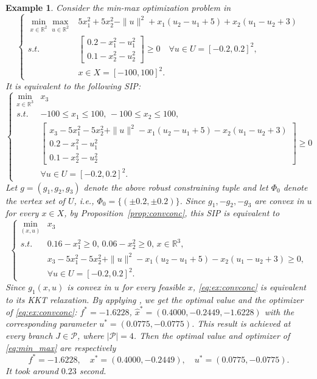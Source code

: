 \documentclass{amsart}
\theoremstyle{plain}
\newtheorem{exmp}[theorem]{Example}
\newcommand{\re}{\mathbb{R}}
\newcommand{\st}{\mathit{s.t.}}
\newcommand{\mc}[1]{\mathcal{#1}}
\newcommand{\bbm}{\begin{bmatrix}}
\newcommand{\ebm}{\end{bmatrix}}
\numberwithin{equation}{section}
\begin{document}
			\begin{exmp}\label{ex:convconc}
			Consider the min-max optimization problem in \cite{PangWu2020}
			\begin{equation}\label{eq:min_max}
			\left\{\begin{array}{cl}
				\min\limits_{x\in\re^2} \max\limits_{u\in \re^2}  & 5x_1^2+5x_2^2-\|u\|^2+x_1(u_2-u_1+5)+x_2(u_1-u_2+3)\\
				\st  & \bbm 0.2-x_1^2-u_1^2\\ 0.1-x_2^2-u_2^2\ebm\ge 0\quad \forall u\in U=[-0.2,0.2]^2,\\
				& x\in X=[-100,100]^2.
			\end{array}
			\right.
			\end{equation}
			It is equivalent to the following SIP:
			\[
			\left\{\begin{array}{cl}
				\min\limits_{x\in\re^3} & x_3\\
				\st & -100\le x_1\le 100,\, -100\le x_2\le 100,\\
				& \bbm x_3-5x_1^2-5x_2^2+\|u\|^2-x_1(u_2-u_1+5)-x_2(u_1-u_2+3)\\ 0.2-x_1^2-u_1^2\\ 0.1-x_2^2-u_2^2
				\ebm \ge 0\\
				& \forall u\in U = [-0.2,0.2]^2.
			\end{array}
			\right.
			\]
			Let $g= (g_1,g_2,g_3)$ denote the above robust constraining tuple 
			and let $\Phi_0$ denote the vertex set of $U$, i.e., 
			$\Phi_0 = \{(\pm 0.2,\pm 0.2)\}$.
			Since $g_1, -g_2, -g_3$ are convex in $u$ for every $x\in X$, 
			by Proposition~\ref{prop:convconc}, this SIP is equivalent to
			\begin{equation}\label{eq:ex:convconc}
				\left\{\begin{array}{cl}
					\min\limits_{(x,u)} & x_3\\
					\st & 0.16-x_1^2\ge 0,\, 0.06-x_2^2\ge 0,\, x\in\re^3,\\
					& x_3-5x_1^2-5x_2^2+\|u\|^2-x_1(u_2-u_1+5)-x_2(u_1-u_2+3)\ge 0,\\
					& \forall u\in U = [-0.2,0.2]^2.
				\end{array}
				\right.
			\end{equation}
			Since $g_1(x,u)$ is convex in $u$ for every feasible $x$, 
			\eqref{eq:ex:convconc} is equivalent to its KKT relaxation. 
			By applying , we get the optimal value and the optimizer of  \eqref{eq:ex:convconc}: 
			$f^* = -1.6228$, $\hat{x}^* = (0.4000, -0.2449, -1.6228)$ with 
			the corresponding parameter $u^*=(0.0775, -0.0775)$. 
			This result is achieved at every branch $J\in\mc{P}$, where $|\mc{P}| = 4$.
			Then the optimal value and optimizer of \eqref{eq:min_max} are respectively
			\[ f^* = -1.6228,\quad x^* = (0.4000, -0.2449),\quad u^* = (0.0775, -0.0775).\]
			It took around $0.23$ second.
		\end{exmp}	
		
\end{document}
